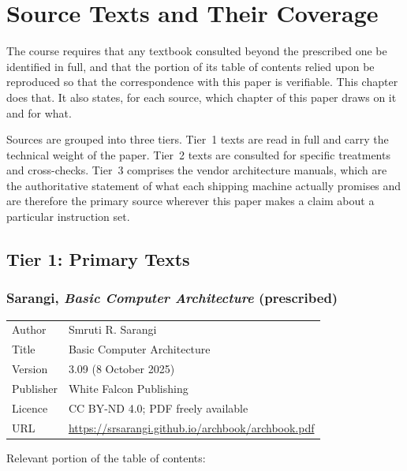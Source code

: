 \chapter{Source Texts and Their Coverage}
\label{ch:sources}

The course requires that any textbook consulted beyond the prescribed one be
identified in full, and that the portion of its table of contents relied upon be
reproduced so that the correspondence with this paper is verifiable.
This chapter
does that.
It also states, for each source, which chapter of this paper draws on
it and for what.

Sources are grouped into three tiers.
Tier~1 texts are read in full and carry the
technical weight of the paper.
Tier~2 texts are consulted for specific treatments
and cross-checks.
Tier~3 comprises the vendor architecture manuals, which are the
authoritative statement of what each shipping machine actually promises and are
therefore the primary source wherever this paper makes a claim about a particular
instruction set.

\section{Tier 1: Primary Texts}

\subsection{Sarangi, \emph{Basic Computer Architecture} (prescribed)}

\begin{table}[H]
\centering
\small
\begin{tabular}{@{}ll@{}}
\toprule
Author      & Smruti R. Sarangi \\
Title       & Basic Computer Architecture \\
Version     & 3.09 (8 October 2025) \\
Publisher   & White Falcon Publishing \\
Licence     & CC BY-ND 4.0; PDF freely available \\
URL         & \url{https://srsarangi.github.io/archbook/archbook.pdf} \\
\bottomrule
\end{tabular}
\end{table}

\noindent Relevant portion of the table of contents:

